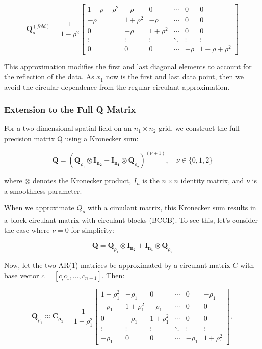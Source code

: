 \documentclass[
  letterpaper,
  DIV=11,
  numbers=noendperiod]{scrartcl}
\begin{document}
\[
\mathbf{Q}_\rho^{(fold)} = \frac{1}{1-\rho^2}
\begin{bmatrix}
1-\rho+\rho^2 & -\rho & 0 & \cdots & 0 & 0 \\
-\rho & 1+\rho^2 & -\rho & \cdots & 0 & 0 \\
0 & -\rho & 1+\rho^2 & \cdots & 0 & 0 \\
\vdots & \vdots & \vdots & \ddots & \vdots & \vdots \\
0 & 0 & 0 & \cdots & -\rho & 1-\rho+\rho^2
\end{bmatrix}
\]

This approximation modifies the first and last diagonal elements to
account for the reflection of the data. As \(x_1\) now is the first and
last data point, then we avoid the circular dependence from the regular
circulant approximation.

\subsubsection{Extension to the Full Q
Matrix}\label{extension-to-the-full-q-matrix}

For a two-dimensional spatial field on an \(n_1 \times n_2\) grid, we
construct the full precision matrix Q using a Kronecker sum:

\[
\mathbf{Q} = \left( \mathbf{Q}_{\rho_1} \otimes \mathbf{I_{n_2}} + \mathbf{I_{n_1}} \otimes \mathbf{Q}_{\rho_2} \right)^{(\nu + 1)}, \quad \nu \in \{0, 1, 2\}
\]

where \(\otimes\) denotes the Kronecker product, \(I_n\) is the
\(n \times n\) identity matrix, and \(\nu\) is a smoothness parameter.

When we approximate \(Q_\rho\) with a circulant matrix, this Kronecker
sum results in a block-circulant matrix with circulant blocks (BCCB). To
see this, let's consider the case where \(\nu = 0\) for simplicity:

\[
\mathbf{Q} = \mathbf{Q}_{\rho_1} \otimes \mathbf{I_{n_2}} + \mathbf{I_{n_1}} \otimes \mathbf{Q}_{\rho_2}
\]

Now, let the two AR(1) matrices be approximated by a circulant matrix
\(C\) with base vector \(c = [c_, c_1, ..., c_{n-1}]\). Then:

\[
\mathbf{Q}_{\rho_1} \approx \mathbf{C_{\rho_1}} = \frac{1}{1-\rho_1^2}
\begin{bmatrix}
1+\rho_1^2 & -\rho_1 & 0 & \cdots & 0 & -\rho_1 \\
-\rho_1 & 1+\rho_1^2 & -\rho_1 & \cdots & 0 & 0 \\
0 & -\rho_1 & 1+\rho_1^2 & \cdots & 0 & 0 \\
\vdots & \vdots & \vdots & \ddots & \vdots & \vdots \\
-\rho_1 & 0 & 0 & \cdots & -\rho_1 & 1+\rho_1^2
\end{bmatrix},
\]
\end{document}
